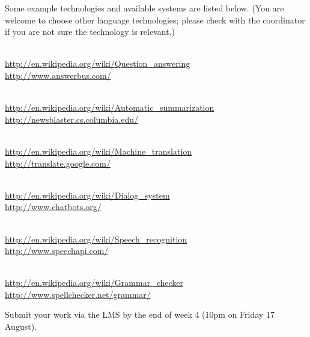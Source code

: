 \documentclass[a4paper,10pt]{article}
\begin{document}
Some example technologies and available systems are listed below.
(You are welcome to choose other language technologies; please check
with the coordinator if you are not sure the technology is relevant.)
\begin{description}\setlength{\itemsep}{0pt}\setlength{\parskip}{0pt}
\item[Question answering:]\hfil\\
\url{http://en.wikipedia.org/wiki/Question_answering}\\
\url{http://www.answerbus.com/}

\item[Automatic summarization:]\hfil\\
\url{http://en.wikipedia.org/wiki/Automatic_summarization}\\
\url{http://newsblaster.cs.columbia.edu/}

\item[Machine translation:]\hfil\\
\url{http://en.wikipedia.org/wiki/Machine_translation}\\
\url{http://translate.google.com/}

\item[Dialogue systems:]\hfil\\
\url{http://en.wikipedia.org/wiki/Dialog_system}\\
\url{http://www.chatbots.org/}

\item[Speech recognition:]\hfil\\
\url{http://en.wikipedia.org/wiki/Speech_recognition}\\
\url{http://www.speechapi.com/}

\item[Grammar checker:]\hfil\\
\url{http://en.wikipedia.org/wiki/Grammar_checker}\\
\url{http://www.spellchecker.net/grammar/}

\end{description}

Submit your work via the LMS by the end of week 4 (10pm on Friday 17 August).
\end{document}
